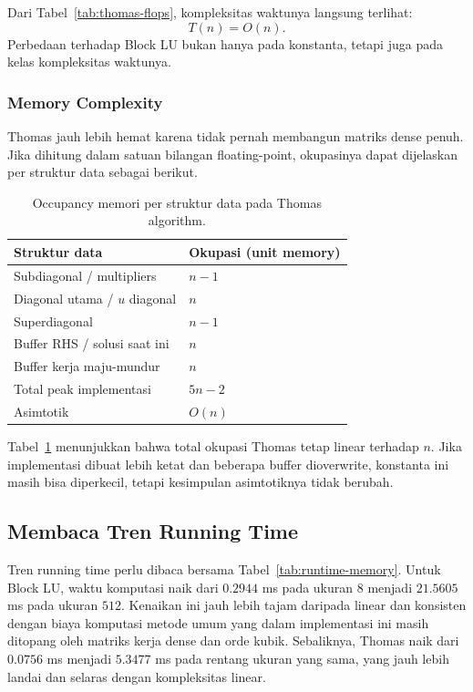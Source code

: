 \documentclass[12pt,a4paper]{article}
\begin{document}
Dari Tabel~\ref{tab:thomas-flops}, kompleksitas waktunya langsung terlihat:
\[
T(n)=O(n).
\]
Perbedaan terhadap Block LU bukan hanya pada konstanta, tetapi juga pada kelas kompleksitas waktunya.

\subsubsection*{Memory Complexity}
Thomas jauh lebih hemat karena tidak pernah membangun matriks dense penuh. Jika dihitung dalam satuan bilangan floating-point, okupasinya dapat dijelaskan per struktur data sebagai berikut.

\begin{table}[h]
\centering
\caption{Occupancy memori per struktur data pada Thomas algorithm.}
\label{tab:thomas-memory}
\begin{tabular}{ll}
\toprule
Struktur data & Okupasi (unit memory) \\
\midrule
Subdiagonal / multipliers & $n-1$ \\
Diagonal utama / $u$ diagonal & $n$ \\
Superdiagonal & $n-1$ \\
Buffer RHS / solusi saat ini & $n$ \\
Buffer kerja maju-mundur & $n$ \\
\midrule
Total peak implementasi & $5n - 2$ \\
Asimtotik & $O(n)$ \\
\bottomrule
\end{tabular}
\end{table}

Tabel~\ref{tab:thomas-memory} menunjukkan bahwa total okupasi Thomas tetap linear terhadap $n$. Jika implementasi dibuat lebih ketat dan beberapa buffer dioverwrite, konstanta ini masih bisa diperkecil, tetapi kesimpulan asimtotiknya tidak berubah.

\subsection{Membaca Tren Running Time}
Tren running time perlu dibaca bersama Tabel~\ref{tab:runtime-memory}. Untuk Block LU, waktu komputasi naik dari $0.2944$ ms pada ukuran $8$ menjadi $21.5605$ ms pada ukuran $512$. Kenaikan ini jauh lebih tajam daripada linear dan konsisten dengan biaya komputasi metode umum yang dalam implementasi ini masih ditopang oleh matriks kerja dense dan orde kubik. Sebaliknya, Thomas naik dari $0.0756$ ms menjadi $5.3477$ ms pada rentang ukuran yang sama, yang jauh lebih landai dan selaras dengan kompleksitas linear.
\end{document}
